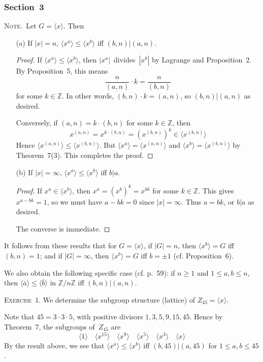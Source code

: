 \documentclass[letterpaper]{article}
\newcommand{\exercise}[1]{\goodbreak\noindent\textsc{Exercise~{#1}.}}
\newcommand{\note}{\goodbreak\noindent\textsc{Note.}}
\newcommand{\Z}{\mathbb{Z}}
\newcommand{\subgroup}{\le}
\newcommand{\res}[1]{\overline{#1}}
\renewcommand{\gcd}[2]{({#1},{#2})}
\newcommand{\ord}[1]{|{#1}|}
\newcommand{\gen}[1]{\langle{#1}\rangle}
\begin{document}
\subsubsection*{Section~3}
\note\ Let $G=\gen{x}$. Then
\begin{enumerate}[itemsep=0pt]
\item[(a)] If $\ord{x}=n$, $\gen{x^a}\subgroup\gen{x^b}$ iff $\gcd{b}{n}|\gcd{a}{n}$.
\begin{proof}
If $\gen{x^a}\subgroup\gen{x^b}$, then $\ord{x^a}$~divides~$\ord{x^b}$ by Lagrange and Proposition~2. By Proposition~5, this means
$$\frac{n}{\gcd{a}{n}}\cdot k=\frac{n}{\gcd{b}{n}}$$
for some $k\in\Z$. In other words, $\gcd{b}{n}\cdot k=\gcd{a}{n}$, so $\gcd{b}{n}|\gcd{a}{n}$ as desired.

Conversely, if $\gcd{a}{n}=k\cdot\gcd{b}{n}$ for some $k\in\Z$, then
$$x^{\gcd{a}{n}}=x^{k\cdot\gcd{b}{n}}=(x^{\gcd{b}{n}})^k\in\gen{x^{\gcd{b}{n}}}$$
Hence $\gen{x^{\gcd{a}{n}}}\subgroup\gen{x^{\gcd{b}{n}}}$. But $\gen{x^a}=\gen{x^{\gcd{a}{n}}}$ and $\gen{x^b}=\gen{x^{\gcd{b}{n}}}$ by Theorem~7(3). This completes the proof.
\end{proof}
\item[(b)] If $\ord{x}=\infty$, $\gen{x^a}\subgroup\gen{x^b}$ iff $b|a$.
\begin{proof}
If $x^a\in\gen{x^b}$, then $x^a=(x^b)^k=x^{bk}$ for some $k\in\Z$. This gives $x^{a-bk}=1$, so we must have $a-bk=0$ since $\ord{x}=\infty$. Thus $a=bk$, or $b|a$ as desired.

The converse is immediate.
\end{proof}
\end{enumerate}
\noindent It follows from these results that for $G=\gen{x}$, if $\ord{G}=n$, then $\gen{x^b}=G$ iff $\gcd{b}{n}=1$; and if $\ord{G}=\infty$, then $\gen{x^b}=G$ iff $b=\pm1$ (cf. Proposition~6).

We also obtain the following specific case (cf. p.~59): if $n\ge 1$ and $1\le a,b\le n$, then $\gen{\res{a}}\subgroup\gen{\res{b}}$ in $\Z/n\Z$ iff $\gcd{b}{n}|\gcd{a}{n}$.

\exercise{1}
We determine the subgroup structure (lattice) of $Z_{45}=\gen{x}$.

Note that $45=3\cdot 3\cdot 5$, with positive divisors $1,3,5,9,15,45$. Hence by Theorem~7, the subgroups of~$Z_{45}$ are
$$\gen{1}\quad\gen{x^{15}}\quad\gen{x^9}\quad\gen{x^5}\quad\gen{x^3}\quad\gen{x}$$
By the result above, we see that $\gen{x^a}\subgroup\gen{x^b}$ iff $\gcd{b}{45}|\gcd{a}{45}$ for $1\le a,b\le 45$.
\end{document}
